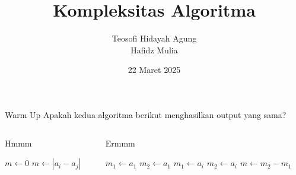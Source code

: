 \documentclass{../praktikum-ppt}
\author[Tew \& Haf]{Teosofi Hidayah Agung \\ Hafidz Mulia}
\date{22 Maret 2025}
\title[Alpro 2 - Week 2]{Kompleksitas Algoritma}
\institute[Matematika ITS]{Departemen Matematika\\ Institut Teknologi Sepuluh Nopember}
\begin{document}
{
\begin{frame}
  \titlepage
\end{frame}
}


\begin{frame}[fragile]
  \begin{exampleblock}{Warm Up}
    Apakah kedua algoritma berikut menghasilkan output yang sama?
  \end{exampleblock}
  \begin{columns}
    \begin{column}{0.45\textwidth}
      \begin{algorithm}[H]
        \caption{Hmmm}
        \begin{algorithmic}[1]
            \State $m \gets 0$
                        \State $m \gets |a_i - a_j|$
                    \EndIf
                \EndFor
            \EndFor
        \EndProcedure
        \end{algorithmic}
        \end{algorithm}
    \end{column}
    \begin{column}{0.45\textwidth}
      \begin{algorithm}[H]
        \caption{Ermmm}
        \begin{algorithmic}[1]
            \State $m_1 \gets a_1$
            \State $m_2 \gets a_1$
                    \State $m_1 \gets a_i$
                    \State $m_2 \gets a_i$
                \EndIf
            \EndFor
            \State $m \gets m_2 - m_1$
        \EndProcedure
        \end{algorithmic}
        \end{algorithm}
    \end{column}
  \end{columns}
\end{frame}
\end{document}

